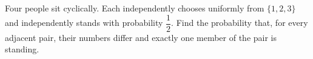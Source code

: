 Four people sit cyclically. Each independently chooses uniformly from $\{1,2,3\}$ and independently stands with probability $\dfrac{1}{2}$. Find the probability that, for every adjacent pair, their numbers differ and exactly one member of the pair is standing.
